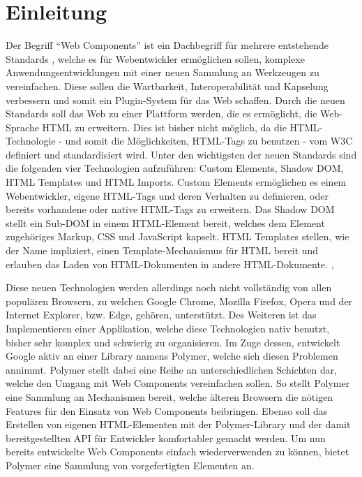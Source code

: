 \chapter{Einleitung}\label{einleitung}

Der Begriff ``Web Components'' ist ein Dachbegriff für mehrere entstehende Standards \cite{citeulike:13844988}, welche es für Webentwickler ermöglichen sollen, komplexe Anwendungsentwicklungen mit einer neuen Sammlung an Werkzeugen zu vereinfachen. Diese sollen die Wartbarkeit, Interoperabilität und Kapselung verbessern und somit ein Plugin-System für das Web schaffen. Durch die neuen Standards soll das Web zu einer Plattform werden, die es ermöglicht, die Web-Sprache HTML zu erweitern. Dies ist bisher nicht möglich, da die HTML-Technologie - und somit die Möglichkeiten, HTML-Tags zu benutzen - vom W3C definiert und standardisiert wird. Unter den wichtigsten der neuen Standards sind die folgenden vier Technologien aufzuführen: Custom Elements, Shadow DOM, HTML Templates und HTML Imports. Custom Elements ermöglichen es einem Webentwickler, eigene HTML-Tags und deren Verhalten zu definieren, oder bereits vorhandene oder native HTML-Tags zu erweitern. Das Shadow DOM stellt ein Sub-DOM in einem HTML-Element bereit, welches dem Element zugehöriges Markup, CSS und JavaScript kapselt. HTML Templates stellen, wie der Name impliziert, einen Template-Mechanismus für HTML bereit und erlauben das Laden von HTML-Dokumenten in andere HTML-Dokumente. \cite{citeulike:13842702}, \cite{citeulike:13842701}

Diese neuen Technologien werden allerdings noch nicht vollständig von allen populären Browsern, zu welchen Google Chrome, Mozilla Firefox, Opera und der Internet Explorer, bzw. Edge, gehören, unterstützt. Des Weiteren ist das Implementieren einer Applikation, welche diese Technologien nativ benutzt, bisher sehr komplex und schwierig zu organisieren. Im Zuge dessen, entwickelt Google aktiv an einer Library namens Polymer, welche sich diesen Problemen annimmt.
Polymer stellt dabei eine Reihe an unterschiedlichen Schichten dar, welche den Umgang mit Web Components vereinfachen sollen. So stellt Polymer eine Sammlung an Mechanismen bereit, welche älteren Browsern die nötigen Features für den Einsatz von Web Components beibringen. Ebenso soll das Erstellen von eigenen HTML-Elementen mit der Polymer-Library und der damit bereitgestellten API für Entwickler komfortabler gemacht werden. Um nun bereits entwickelte Web Components einfach wiederverwenden zu können, bietet Polymer eine Sammlung von vorgefertigten Elementen an.

